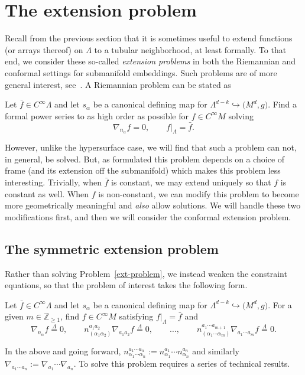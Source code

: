 \documentclass[pdftex]{sigma}
\numberwithin{equation}{section}
\renewcommand{\=}{\stackrel \Lambda =}
\begin{document}
\section{The extension problem} \label{ext-prob-sec}
Recall from the previous section that it is sometimes useful to extend functions (or arrays thereof) on $\Lambda$ to a tubular neighborhood, at least formally. To that end, we consider these so-called \textit{extension problems} in both the Riemannian and conformal settings for submanifold embeddings. Such problems are of more general interest, see~\cite{GW}. A Riemannian problem can be stated as
\begin{Problem} \label{ext-problem}
Let $\bar{f} \in C^\infty \Lambda$ and let $s_{\alpha}$ be a canonical defining map for $\Lambda^{d-k} \hookrightarrow \bigl(M^d,g\bigr)$. Find a formal power series to as high order as possible for $f \in C^\infty M$ solving
\[\nabla_{n_{\alpha}} f = 0 , \qquad f|_{\Lambda} = \bar{f} .\]
\end{Problem}
However, unlike the hypersurface case, we will find that such a problem can not, in general, be solved. But, as formulated this problem depends on a choice of frame (and its extension off the submanifold) which makes this problem less interesting. Trivially, when $\bar{f}$ is constant, we may extend uniquely so that $f$ is constant as well. When $f$ is non-constant, we can modify this problem to become more geometrically meaningful and \textit{also} allow solutions. We will handle these two modifications first, and then we will consider the conformal extension problem.

\subsection{The symmetric extension problem}
Rather than solving Problem~\ref{ext-problem}, we instead weaken the constraint equations, so that the problem of interest takes the following form.

\begin{Problem} \label{sym-ext-problem}
Let $\bar{f} \in C^\infty \Lambda$ and let $s_{\alpha}$ be a canonical defining map for $\Lambda^{d-k} \hookrightarrow \bigl(M^d,g\bigr)$. For a given $m \in \mathbb{Z}_{\geq 1}$, find $f \in C^\infty M$ satisfying $f|_{\Lambda} = \bar{f}$ and
\[\nabla_{n_{\alpha}} f \= 0 , \qquad n^{a_1 a_2}_{(\alpha_1 \alpha_2)} \nabla_{a_1 a_2} f \= 0 , \qquad \ldots , \qquad n^{a_1 \cdots a_{m+1}}_{(\alpha_1 \cdots \alpha_{m})} \nabla_{a_1 \cdots a_{m}} f \= 0 .\]
\end{Problem}
\noindent
In the above and going forward, $n^{a_1 \cdots a_n}_{\alpha_1 \cdots \alpha_n} := n^{a_1}_{\alpha_1} \cdots n^{a_n}_{\alpha_n}$ and similarly $\nabla_{a_1 \cdots a_n} := \nabla_{a_1} \cdots \nabla_{a_n}$. To solve this problem requires a series of technical results.
\end{document}
